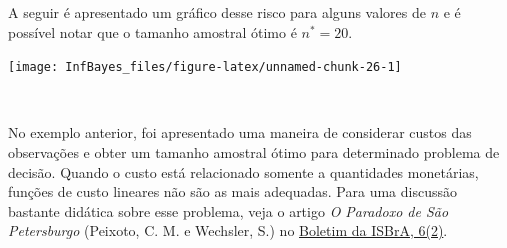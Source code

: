 \documentclass[
]{book}
\newenvironment{Shaded}{\begin{snugshade}}{\end{snugshade}}
\newcommand{\DataTypeTok}[1]{\textcolor[rgb]{0.13,0.29,0.53}{#1}}
\newcommand{\DecValTok}[1]{\textcolor[rgb]{0.00,0.00,0.81}{#1}}
\newcommand{\FloatTok}[1]{\textcolor[rgb]{0.00,0.00,0.81}{#1}}
\newcommand{\KeywordTok}[1]{\textcolor[rgb]{0.13,0.29,0.53}{\textbf{#1}}}
\newcommand{\NormalTok}[1]{#1}
\newcommand{\OperatorTok}[1]{\textcolor[rgb]{0.81,0.36,0.00}{\textbf{#1}}}
\newcommand{\StringTok}[1]{\textcolor[rgb]{0.31,0.60,0.02}{#1}}
\begin{document}
A seguir é apresentado um gráfico desse risco para alguns valores de \(n\) e é possível notar que o tamanho amostral ótimo é \({n}^*=20\).

\begin{Shaded}
\end{Shaded}

\begin{center}\texttt{[image: InfBayes\_files/figure-latex/unnamed-chunk-26-1]} \end{center}

\(~\)

No exemplo anterior, foi apresentado uma maneira de considerar custos das observações e obter um tamanho amostral ótimo para determinado problema de decisão. Quando o custo está relacionado somente a quantidades monetárias, funções de custo lineares não são as mais adequadas. Para uma discussão bastante didática sobre esse problema, veja o artigo \emph{O Paradoxo de São Petersburgo} (Peixoto, C. M. e Wechsler, S.) no \href{https://www.ime.usp.br/~isbra/boletim/boletim_2013_v06_n02.pdf}{Boletim da ISBrA, 6(2)}.
\end{document}

